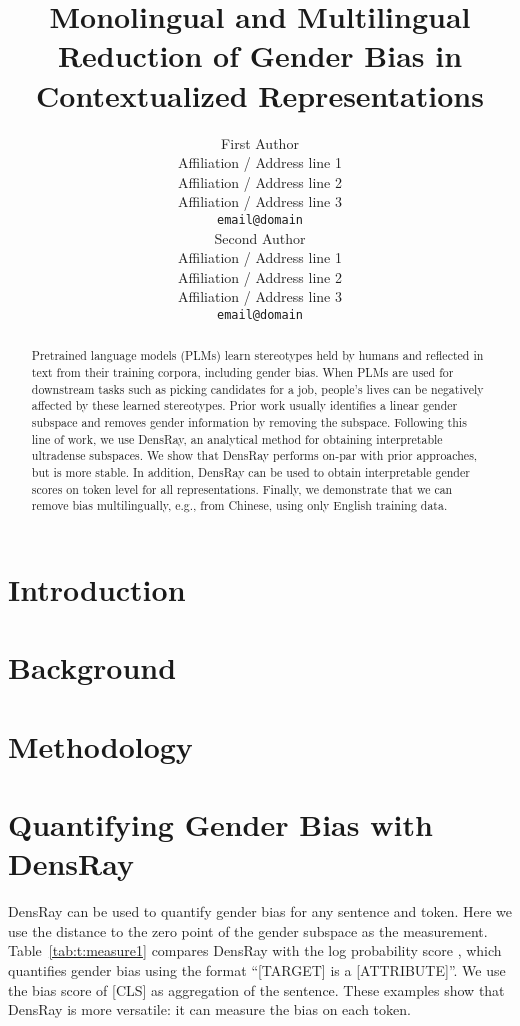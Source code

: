 \documentclass[11pt,a4paper]{article}
\title{Monolingual and Multilingual Reduction of Gender Bias in Contextualized Representations}
\author{First Author \\
  Affiliation / Address line 1 \\
  Affiliation / Address line 2 \\
  Affiliation / Address line 3 \\
  \texttt{email@domain} \\\And
  Second Author \\
  Affiliation / Address line 1 \\
  Affiliation / Address line 2 \\
  Affiliation / Address line 3 \\
  \texttt{email@domain} \\}
\date{}
\def\tabref#1{Table~\ref{tab:#1}}
\begin{document}
\maketitle

\begin{abstract}

Pretrained language models (PLMs) learn 
stereotypes
held by humans and reflected in text
from their training corpora,
including gender bias.  When PLMs are used for downstream
tasks such as picking candidates for a job, people's lives
can be negatively affected by these learned stereotypes.
Prior work usually identifies a linear gender subspace and
removes gender information by removing the
subspace. Following this line of work, we use DensRay, an
analytical method for obtaining interpretable ultradense
subspaces. We show that DensRay performs on-par with prior
approaches, but is more stable. In addition, DensRay can be
used to obtain interpretable gender scores on token level
for all representations.  Finally, we demonstrate that we
can remove bias multilingually, e.g., from Chinese, using
only English training data.

\end{abstract}

\section{Introduction}


\section{Background}


\section{Methodology}


\section{Quantifying Gender Bias with DensRay}
DensRay can be used to quantify gender bias for any sentence
and token. Here we use the distance to the zero point of the
gender subspace as the measurement. \tabref{t:measure1}
compares DensRay with the log probability score
\citep{kurita2019measuring}, which quantifies gender bias
using the format ``[TARGET] is a [ATTRIBUTE]''. We use the
bias score of [CLS] as aggregation of the sentence. These examples show that DensRay is more versatile:
it can measure the bias on each token.
\end{document}

